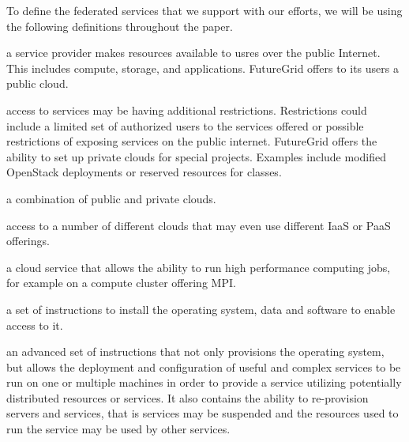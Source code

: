 \documentclass{tex/sig-alternate}
\begin{document}
To define the federated services that we support with our efforts, we will be
using the following definitions throughout the paper.

\begin{description}
   \setlength{\itemsep}{0pt}
   \setlength{\parsep}{0pt}

\item[public-cloud:]  a service provider makes resources available to
  usres over the public Internet. This includes compute, storage, and
  applications. FutureGrid offers to its users a public cloud. 

\item[private-cloud:] access to services may be having additional
  restrictions. Restrictions could include a limited set of authorized
  users to the services offered or  possible restrictions of exposing services on the public
  internet. FutureGrid offers the ability to set up private clouds for
  special projects. Examples include modified OpenStack deployments or
  reserved resources for classes.

\item[hybrid-cloud:] a combination of public and private clouds. 

\item[multi-cloud:] access to a number of different clouds that may
  even use different IaaS or PaaS offerings. 

\item[hpc-service:] a cloud service that allows the ability to run high
  performance computing jobs, for example on a compute cluster
  offering MPI. 

\item[provisioning:] a set of instructions to install the operating
  system, data and software to enable access to it. 

\item[rain:] an advanced set of instructions that not only provisions
  the operating system, but allows the deployment and configuration of
  useful and complex services to be run on one or multiple machines in
  order to provide a service utilizing potentially distributed
  resources or services.  It also contains the ability to re-provision
  servers and services, that is services may be suspended and the
  resources used to run the service may be used by other services.

\end{description}

\end{document}

